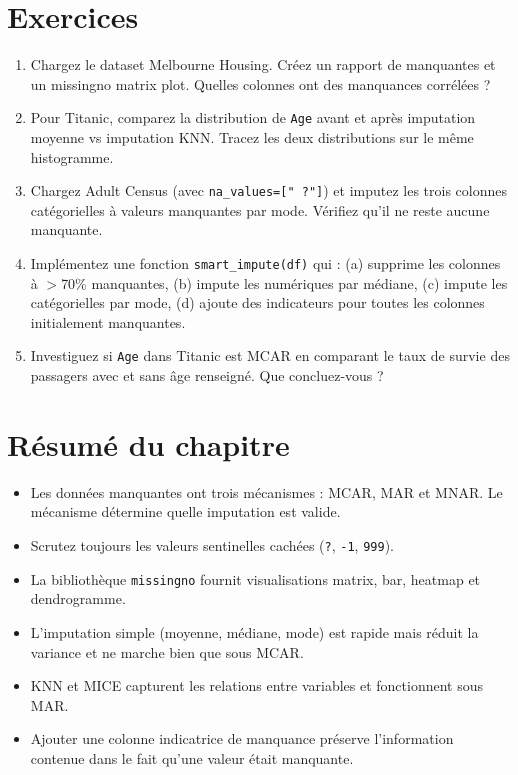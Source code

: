 \section{Exercices}

\begin{exercise}
\begin{enumerate}
  \item Chargez le dataset Melbourne Housing. Cr\'eez un rapport de manquantes et un missingno matrix plot. Quelles colonnes ont des manquances corr\'el\'ees ?
  \item Pour Titanic, comparez la distribution de \texttt{Age} avant et apr\`es imputation moyenne vs imputation KNN. Tracez les deux distributions sur le m\^eme histogramme.
  \item Chargez Adult Census (avec \texttt{na\_values=[" ?"]}) et imputez les trois colonnes cat\'egorielles \`a valeurs manquantes par mode. V\'erifiez qu'il ne reste aucune manquante.
  \item Impl\'ementez une fonction \texttt{smart\_impute(df)} qui : (a) supprime les colonnes \`a $>$70\% manquantes, (b) impute les num\'eriques par m\'ediane, (c) impute les cat\'egorielles par mode, (d) ajoute des indicateurs pour toutes les colonnes initialement manquantes.
  \item Investiguez si \texttt{Age} dans Titanic est MCAR en comparant le taux de survie des passagers avec et sans \^age renseign\'e. Que concluez-vous ?
\end{enumerate}
\end{exercise}

\section{R\'esum\'e du chapitre}

\begin{itemize}
  \item Les donn\'ees manquantes ont trois m\'ecanismes : MCAR, MAR et MNAR. Le m\'ecanisme d\'etermine quelle imputation est valide.
  \item Scrutez toujours les valeurs sentinelles cach\'ees (\texttt{?}, \texttt{-1}, \texttt{999}).
  \item La biblioth\`eque \texttt{missingno} fournit visualisations matrix, bar, heatmap et dendrogramme.
  \item L'imputation simple (moyenne, m\'ediane, mode) est rapide mais r\'eduit la variance et ne marche bien que sous MCAR.
  \item KNN et MICE capturent les relations entre variables et fonctionnent sous MAR.
  \item Ajouter une colonne indicatrice de manquance pr\'eserve l'information contenue dans le fait qu'une valeur \'etait manquante.
\end{itemize}
